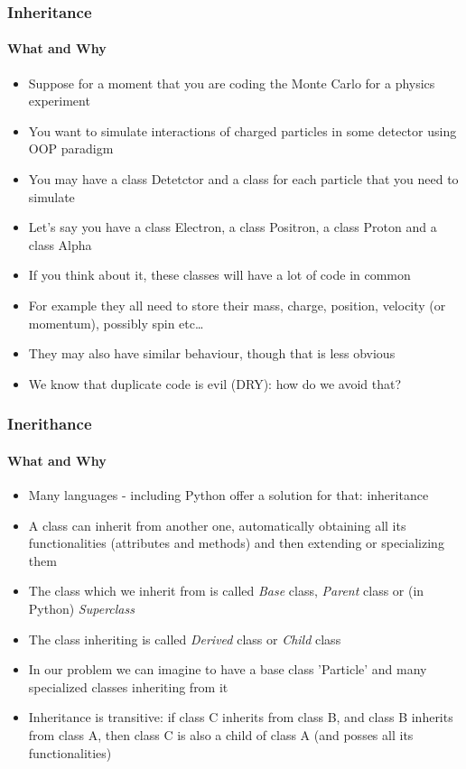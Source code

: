 \documentclass[9pt]{beamer}
\begin{document}
\begin{frame}
  \frametitle{Inheritance}
  \framesubtitle{What and Why}
    
  \begin{itemize}
    \small
    \item Suppose for a moment that you are coding the Monte Carlo for a physics experiment
    \medskip
    \item You want to simulate interactions of charged particles in some detector using OOP paradigm
    \medskip
    \item You may have a class Detetctor and a class for each particle that you need to simulate
    \medskip
    \item Let's say you have a class Electron, a class Positron, a class Proton and a class Alpha
    \medskip
    \item If you think about it, these classes will have a lot of code in common
    \medskip
    \item For example they all need to store their mass, charge, position, velocity (or momentum), possibly spin etc\dots
    \medskip
    \item They may also have similar behaviour, though that is less obvious
    \medskip
    \item We know that duplicate code is evil (DRY): how do we avoid that?
  \end{itemize}
  
\end{frame}


\begin{frame}
  \frametitle{Inerithance}
  \framesubtitle{What and Why}
    
  \begin{itemize}
    \small
    \item Many languages - including Python offer a solution for that: \alert{inheritance}
    \medskip
    \item A class can inherit from another one, automatically obtaining all its functionalities (attributes and methods) and then extending or specializing them
    \medskip
    \item The class which we inherit from is called \emph{Base} class, \emph{Parent} class or (in Python) \emph{Superclass}
    \medskip
    \item The class inheriting is called \emph{Derived} class or \emph{Child} class
    \medskip
    \item In our problem we can imagine to have a base class 'Particle' and many specialized classes inheriting from it
    \medskip
    \item Inheritance is transitive: if class C inherits from class B, and class B inherits from class A, then class C is also a child of class A (and posses all its functionalities)
  \end{itemize}
  
\end{frame}
\end{document}
